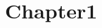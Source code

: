 
\chapter{Chapter1} %

\label{Chapter1} %


\newcommand{\keyword}[1]{\textbf{#1}}
\newcommand{\tabhead}[1]{\textbf{#1}}
\newcommand{\code}[1]{\texttt{#1}}
\newcommand{\file}[1]{\texttt{\bfseries#1}}
\newcommand{\option}[1]{\texttt{\itshape#1}}



